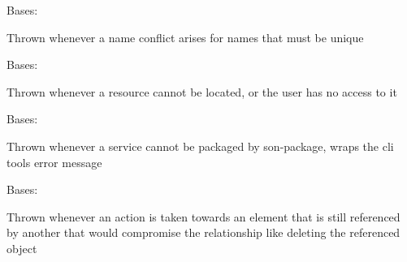 \documentclass[letterpaper,10pt,english]{sphinxmanual}
\begin{document}
\begin{fulllineitems}
\label{_source/son_editor.app:son_editor.app.exceptions.NameConflict}
Bases: 

Thrown whenever a name conflict arises for names that must be unique

\end{fulllineitems}


\begin{fulllineitems}
\label{_source/son_editor.app:son_editor.app.exceptions.NotFound}
Bases: 

Thrown whenever a resource cannot be located, or the user has no access to it

\end{fulllineitems}


\begin{fulllineitems}
\label{_source/son_editor.app:son_editor.app.exceptions.PackException}
Bases: 

Thrown whenever a service cannot be packaged by son-package, wraps the cli tools error message

\end{fulllineitems}


\begin{fulllineitems}
\label{_source/son_editor.app:son_editor.app.exceptions.StillReferenced}
Bases: 

Thrown whenever an action is taken towards an element that is still 
referenced by another that would compromise the relationship like 
deleting the referenced object

\end{fulllineitems}

\end{document}
